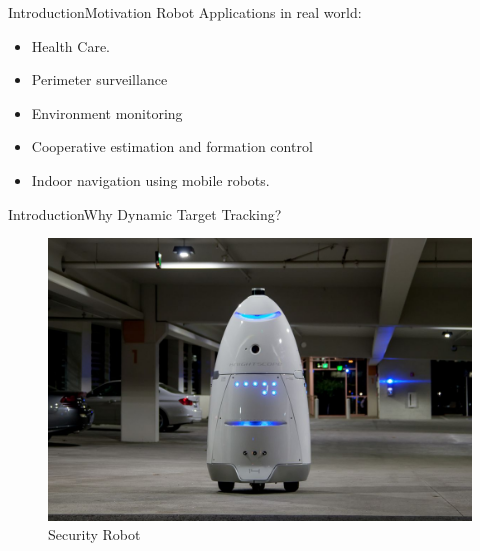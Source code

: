 \documentclass{beamer}
\begin{document}
\begin{frame}{Introduction}{Motivation}
Robot Applications in real world:
\begin{itemize}
\item Health Care.
\item  Perimeter surveillance 
\item Environment monitoring 
\item  Cooperative estimation and formation control
\item Indoor navigation using mobile robots.
\end{itemize}
  
\end{frame}

\begin{frame}{Introduction}{Why Dynamic Target Tracking?}
\begin{figure}
\includegraphics[scale=0.2]{figs/img/security.jpg}
\caption{Security Robot}
\end{figure}
\end{frame}

\end{document}
